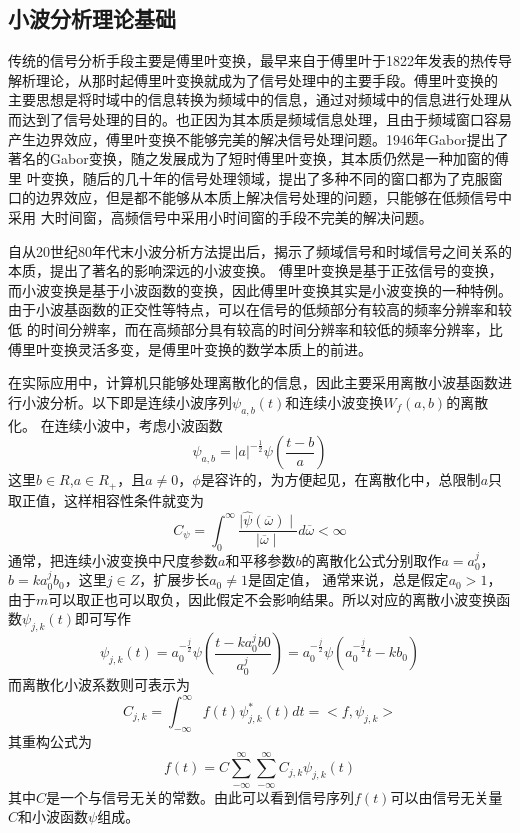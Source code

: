 \subsection{小波分析理论基础}
传统的信号分析手段主要是傅里叶变换，最早来自于傅里叶于1822年发表的热传导解析理论，从那时起傅里叶变换就成为了信号处理中的主要手段。傅里叶变换的
主要思想是将时域中的信息转换为频域中的信息，通过对频域中的信息进行处理从而达到了信号处理的目的。也正因为其本质是频域信息处理，且由于频域窗口容易
产生边界效应，傅里叶变换不能够完美的解决信号处理问题。1946年Gabor提出了著名的Gabor变换，随之发展成为了短时傅里叶变换，其本质仍然是一种加窗的傅里
叶变换，随后的几十年的信号处理领域，提出了多种不同的窗口都为了克服窗口的边界效应，但是都不能够从本质上解决信号处理的问题，只能够在低频信号中采用
大时间窗，高频信号中采用小时间窗的手段不完美的解决问题。\par
自从20世纪80年代末小波分析方法提出后，揭示了频域信号和时域信号之间关系的本质，提出了著名的影响深远的小波变换。
傅里叶变换是基于正弦信号的变换，而小波变换是基于小波函数的变换，因此傅里叶变换其实是小波变换的一种特例。由于小波基函数的正交性等特点，可以在信号的低频部分有较高的频率分辨率和较低
的时间分辨率，而在高频部分具有较高的时间分辨率和较低的频率分辨率\cite{lph2011}，比傅里叶变换灵活多变，是傅里叶变换的数学本质上的前进。
\par 在实际应用中，计算机只能够处理离散化的信息，因此主要采用离散小波基函数进行小波分析。以下即是连续小波序列$\psi_{a,b}(t)$和连续小波变换$W_{f}(a,b)$的离散化。
在连续小波中，考虑小波函数
\begin{equation}
	\psi_{a,b}=|a|^{-\frac{1}{2}}\psi(\frac{t-b}{a})
\end{equation}
这里$b\in R$,$a\in R_{+}$，且$a\neq0$，$\phi$是容许的，为方便起见，在离散化中，总限制$a$只取正值，这样相容性条件\cite{lyhsz2008,dys2005}就变为
\begin{equation}
	C_{\psi}=\int^{\infty}_{0}\frac{\mid \widehat{\psi}(\overline{\omega})\mid}{\mid \overline{\omega}\mid}d\overline{\omega} < \infty
\end{equation}
通常\cite{shr2009}，把连续小波变换中尺度参数$a$和平移参数$b$的离散化公式分别取作$a=a_{0}^{j}$，$b=ka_{0}^{j}b_{0}$，这里$j\in Z$，扩展步长$a_{0}\neq 1$是固定值，
通常来说，总是假定$a_{0}>1$，由于$m$可以取正也可以取负，因此假定不会影响结果。所以对应的离散小波变换函数$\psi_{j,k}(t)$即可写作
\begin{equation}
	\psi_{j,k}(t)=a^{-\frac{j}{2}}_{0}\psi(\frac{t-ka_{0}^{j}b0}{a_{0}^{j}})=a_{0}^{-\frac{j}{2}}\psi(a_{0}^{-\frac{j}{2}}t-kb_{0})
\end{equation}
而离散化小波系数则可表示为
\begin{equation}
	C_{j,k}=\int_{-\infty}^{\infty}f(t)\psi_{j,k}^{*}(t)dt=<f,\psi_{j,k}>
\end{equation}
其重构公式为
\begin{equation}
	f(t)=C\sum_{-\infty}^{\infty}\sum_{-\infty}^{\infty}C_{j,k}\psi_{j,k}(t)
\end{equation}
其中$C$是一个与信号无关的常数。由此可以看到信号序列$f(t)$可以由信号无关量$C$和小波函数$\psi$组成。
